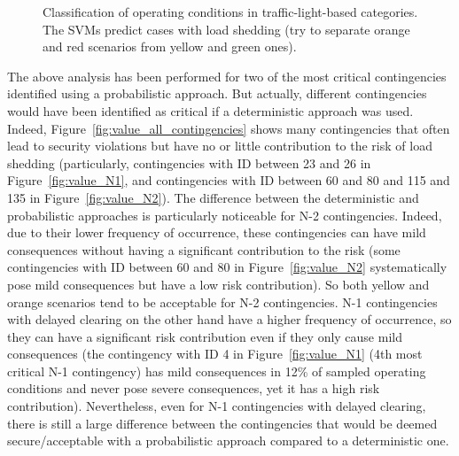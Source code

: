 \begin{figure}
{
}
\caption{Classification of operating conditions in traffic-light-based categories. The SVMs predict cases with load shedding (\ie try to separate orange and red scenarios from yellow and green ones).}
\label{fig:cascade_value}
\end{figure}

The above analysis has been performed for two of the most critical contingencies identified using a probabilistic approach. But actually, different contingencies would have been identified as critical if a deterministic approach was used. Indeed, Figure~\ref{fig:value_all_contingencies} shows many contingencies that often lead to security violations but have no or little contribution to the risk of load shedding (particularly, contingencies with ID between 23 and 26 in Figure~\ref{fig:value_N1}, and contingencies with ID between 60 and 80 and 115 and 135 in Figure~\ref{fig:value_N2}). The difference between the deterministic and probabilistic approaches is particularly noticeable for N-2 contingencies. Indeed, due to their lower frequency of occurrence, these contingencies can have mild consequences without having a significant contribution to the risk (\eg some contingencies with ID between 60 and 80 in Figure~\ref{fig:value_N2} systematically pose mild consequences but have a low risk contribution). So both yellow and orange scenarios tend to be acceptable for N-2 contingencies. N-1 contingencies with delayed clearing on the other hand have a higher frequency of occurrence, so they can have a significant risk contribution even if they only cause mild consequences (\eg the contingency with ID 4 in Figure~\ref{fig:value_N1} (4th most critical N-1 contingency) has mild consequences in 12\% of sampled operating conditions and never pose severe consequences, yet it has a high risk contribution). Nevertheless, even for N-1 contingencies with delayed clearing, there is still a large difference between the contingencies that would be deemed secure/acceptable with a probabilistic approach compared to a deterministic one.


